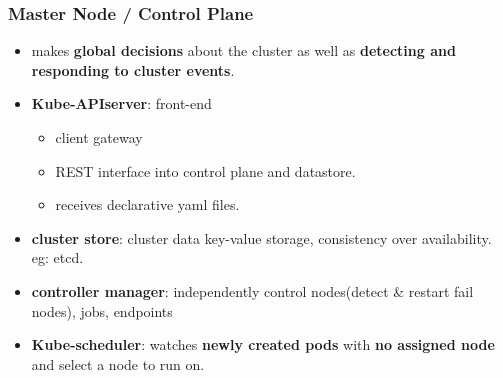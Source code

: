 \subsubsection{Master Node / Control Plane}
\begin{itemize}
	\item makes \textbf{global decisions} about the cluster as well as \textbf{detecting and responding to cluster events}.
	
	
		\item \textbf{Kube-APIserver}: front-end
		\begin{itemize}
			\item client gateway
			\item REST interface into control plane and datastore.
			\item receives declarative yaml files.
		\end{itemize}
		
		\item \textbf{cluster store}: cluster data key-value storage, consistency over availability. eg: etcd.
		
		\item \textbf{controller manager}: independently control nodes(detect \& restart fail nodes), jobs, endpoints 
		
		\item \textbf{Kube-scheduler}: watches \textbf{newly created pods} with \textbf{no assigned node} and select a node to run on.

\end{itemize}

